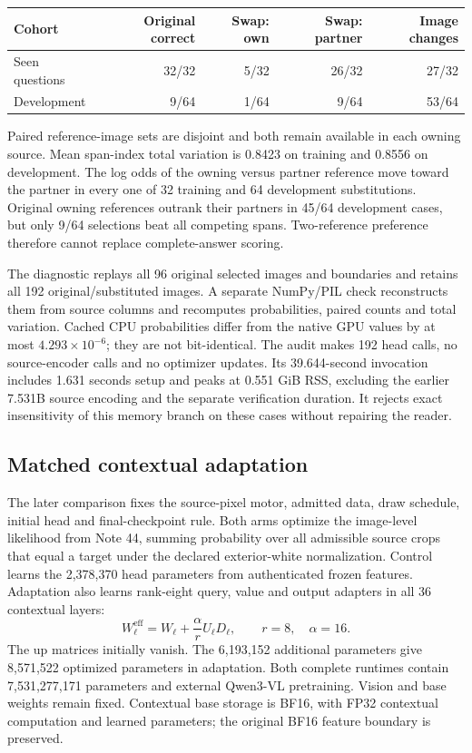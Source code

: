 \documentclass[10pt,a4paper]{article}
\begin{document}
\begin{center}\small
\begin{tabular}{lrrrr}
\toprule
Cohort & Original correct & Swap: own & Swap: partner & Image changes\\
\midrule
Seen questions & 32/32 & 5/32 & 26/32 & 27/32\\
Development & 9/64 & 1/64 & 9/64 & 53/64\\
\bottomrule
\end{tabular}
\end{center}
Paired reference-image sets are disjoint and both remain available in each
owning source. Mean span-index total variation is 0.8423 on training and
0.8556 on development. The log odds of the owning versus partner reference
move toward the partner in every one of 32 training and 64 development
substitutions. Original owning references outrank their partners in 45/64
development cases, but only 9/64 selections beat all competing spans.
Two-reference preference therefore cannot replace complete-answer scoring.

The diagnostic replays all 96 original selected images and boundaries and
retains all 192 original/substituted images. A separate NumPy/PIL check
reconstructs them from source columns and recomputes probabilities, paired
counts and total variation. Cached CPU probabilities differ from the native
GPU values by at most $4.293\times10^{-6}$; they are not bit-identical.
The audit makes 192 head calls, no source-encoder calls and no optimizer
updates. Its 39.644-second invocation includes 1.631 seconds setup and peaks
at 0.551 GiB RSS, excluding the earlier 7.531B source encoding and the
separate verification duration. It rejects exact insensitivity of this
memory branch on these cases without repairing the reader.

\subsection*{Matched contextual adaptation}
The later comparison fixes the source-pixel motor, admitted data, draw
schedule, initial head and final-checkpoint rule. Both arms optimize the
image-level likelihood from Note 44, summing probability over all admissible
source crops that equal a target under the declared exterior-white
normalization. Control learns the 2,378,370 head parameters from authenticated
frozen features. Adaptation also learns rank-eight query, value and output
adapters in all 36 contextual layers:
\[
 W_\ell^{\mathrm{eff}}
   =W_\ell+\frac{\alpha}{r}U_\ell D_\ell,
 \qquad r=8,\quad \alpha=16 .
\]
The up matrices initially vanish. The 6,193,152 additional parameters give
8,571,522 optimized parameters in adaptation. Both complete runtimes contain
7,531,277,171 parameters and external Qwen3-VL pretraining. Vision and base
weights remain fixed. Contextual base storage is BF16, with FP32 contextual
computation and learned parameters; the original BF16 feature boundary is
preserved.
\end{document}
